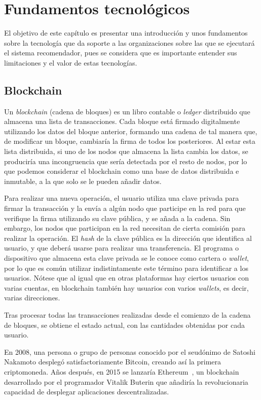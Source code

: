 \chapter{Fundamentos tecnológicos}

El objetivo de este capítulo es presentar una introducción y unos fundamentos sobre la tecnología que da soporte a las organizaciones sobre las que se ejecutará el sistema recomendador, pues se considera que es importante entender sus limitaciones y el valor de estas tecnologías.

\section{Blockchain}

Un \textit{blockchain} (cadena de bloques) es un libro contable o \textit{ledger} distribuido que almacena una lista de transacciones. Cada bloque está firmado digitalmente utilizando los datos del bloque anterior, formando una cadena de tal manera que, de modificar un bloque, cambiaría la firma de todos los posteriores. Al estar esta lista distribuida, si uno de los nodos que almacena la lista cambia los datos, se produciría una incongruencia que sería detectada por el resto de nodos, por lo que podemos considerar el blockchain como una base de datos distribuida e inmutable, a la que solo se le pueden añadir datos.

Para realizar una nueva operación, el usuario utiliza una clave privada para firmar la transacción y la envía a algún nodo que participe en la red para que verifique la firma utilizando su clave pública, y se añada a la cadena. Sin embargo, los nodos que participan en la red necesitan de cierta comisión para realizar la operación. El \textit{hash} de la clave pública es la dirección que identifica al usuario, y que deberá usarse para realizar una transferencia. El programa o dispositivo que almacena esta clave privada se le conoce como cartera o \textit{wallet}, por lo que es común utilizar indistintamente este término para identificar a los usuarios. Nótese que al igual que en otras plataformas hay ciertos usuarios con varias cuentas, en blockchain también hay usuarios con varios \textit{wallets}, es decir, varias direcciones.

Tras procesar todas las transacciones realizadas desde el comienzo de la cadena de bloques, se obtiene el estado actual, con las cantidades obtenidas por cada usuario.

En 2008, una persona o grupo de personas conocido por el seudónimo de Satoshi Nakamoto desplegó satisfactoriamente Bitcoin, creando así la primera criptomoneda. Años después, en 2015 se lanzaría Ethereum~\cite{tual_ethereum_2015}, un blockchain desarrollado por el programador Vitalik Buterin que añadiría la revolucionaria capacidad de desplegar aplicaciones descentralizadas.

